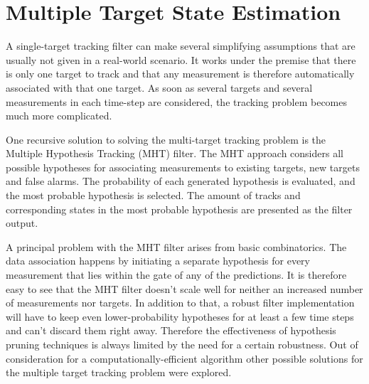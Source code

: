 \section{Multiple Target State Estimation}\label{sec:CMTT}

A single-target tracking filter can make several simplifying assumptions that are usually not given in a real-world scenario. It works under the premise that there is only one target to track and that any measurement is therefore automatically associated with that one target. As soon as several targets and several measurements in each time-step are considered, the tracking problem becomes much more complicated.

One recursive solution to solving the multi-target tracking problem is the Multiple Hypothesis Tracking (MHT) filter. The MHT approach considers all possible hypotheses for associating measurements to existing targets, new targets and false alarms. The probability of each generated hypothesis is evaluated, and the most probable hypothesis is selected. The amount of tracks and corresponding states in the most probable hypothesis are presented as the filter output. 

A principal problem with the MHT filter arises from basic combinatorics. The data association happens by initiating a separate hypothesis for every measurement that lies within the gate of any of the predictions. It is therefore easy to see that the MHT filter doesn't scale well for neither an increased number of measurements nor targets. In addition to that, a robust filter implementation will have to keep even lower-probability hypotheses for at least a few time steps and can't discard them right away. Therefore the effectiveness of hypothesis pruning techniques is always limited by the need for a certain robustness. Out of consideration for a computationally-efficient algorithm other possible solutions for the multiple target tracking problem were explored.

